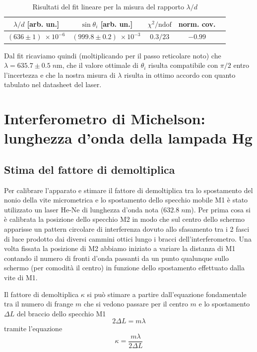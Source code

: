 \documentclass[10pt, a4paper, italian]{article}
\begin{document}
\begin{table}
\centering
\begin{tabular}{ccccc}
\toprule
$\lambda/d$ [arb. un.] & $\sin{\theta_i}$ [arb. un.] &
$\chi^2/\text{ndof}$ & norm. cov. \\
\midrule
$(636 \pm 1) \; \times 10^{-6}$ & $(999.8 \pm 0.2) \; \times 10^{-3}$ &
$0.3/23$ & $-0.99$ \\
\bottomrule
\end{tabular}
\caption{Risultati del fit lineare per la misura del rapporto $\lambda/d$
\label{tab: linfit}}
\end{table}

Dal fit ricaviamo quindi (moltiplicando per il passo reticolare noto) che
$\lambda = 635.7 \pm 0.5 \; \si{n\m}$, che il valore ottimale di $\theta_i$
risulta compatibile con $\pi/2$ entro l'incertezza e che la nostra misura di
$\lambda$ risulta in ottimo accordo con quanto tabulato nel datasheet del
laser.

\section{Interferometro di Michelson: lunghezza d'onda della lampada Hg}
\subsection{Stima del fattore di demoltiplica}
Per calibrare l'apparato e stimare il fattore di demoltiplica tra lo
spostamento del nonio della vite micrometrica e lo spostamento dello
specchio mobile M1 è stato utilizzato un laser He-Ne di lunghezza d'onda nota
($632.8 \; \si{n\m}$).
Per prima cosa si è calibrata la posizione dello specchio M2 in modo che sul
centro dello schermo apparisse un pattern circolare di interferenza dovuto
allo sfasamento tra i 2 fasci di luce prodotto dai diversi cammini ottici
lungo i bracci dell'interferometro.
Una volta fissata la posizione di M2 abbiamo iniziato a variare la distanza
di M1 contando il numero di fronti d'onda passanti da un punto qualunque
sullo schermo (per comodità il centro) in funzione dello spostamento
effettuato dalla vite di M1. 

Il fattore di demoltiplica $\kappa$ si può stimare a partire dall'equazione
fondamentale tra il numero di frange $m$ che si vedono passare per il centro
$m$ e lo spostamento $\Delta L$ del braccio dello specchio M1
\begin{equation}\label{eq: fond}
2 \Delta L = m \lambda
\end{equation}
tramite l'equazione
\begin{equation}\label{eq: dem}
\kappa = \frac{m \lambda}{2 \Delta L}
\end{equation}
\end{document}
